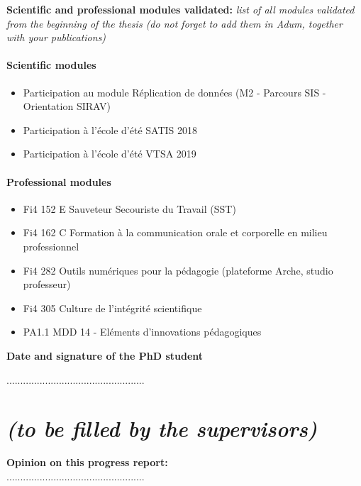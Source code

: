 \documentclass[12pt]{article}
\newcommand{\commentaire}[1]{\small\textit{#1}}
\begin{document}
\noindent\textbf{Scientific and professional modules validated:}
\commentaire{%
  list of all modules validated from the beginning of the thesis (do
  not forget to add them in Adum, together with your publications)}
\paragraph{\footnotesize Scientific modules}
  \begin{itemize}
      \itemsep0em
      \item Participation au module Réplication de données (M2 - Parcours SIS - Orientation SIRAV)
      \item Participation à l'école d'été SATIS 2018
      \item Participation à l'école d'été VTSA 2019
  \end{itemize}
\paragraph{\footnotesize Professional modules}
  \begin{itemize}
      \itemsep0em
      \item Fi4 152 E Sauveteur Secouriste du Travail (SST)
      \item Fi4 162 C Formation à la communication orale et corporelle en milieu professionnel
      \item Fi4 282 Outils numériques pour la pédagogie (plateforme Arche, studio professeur)
      \item Fi4 305 Culture de l’intégrité scientifique
      \item PA1.1 MDD 14 - Eléments d’innovations pédagogiques
  \end{itemize}

\noindent\textbf{Date and signature of the PhD student}

..................................................


\newpage
\section*{ \textit{\small (to be filled by the supervisors)}}

\noindent\textbf{Opinion on this progress report:}\\
..................................................
\\
\end{document}
